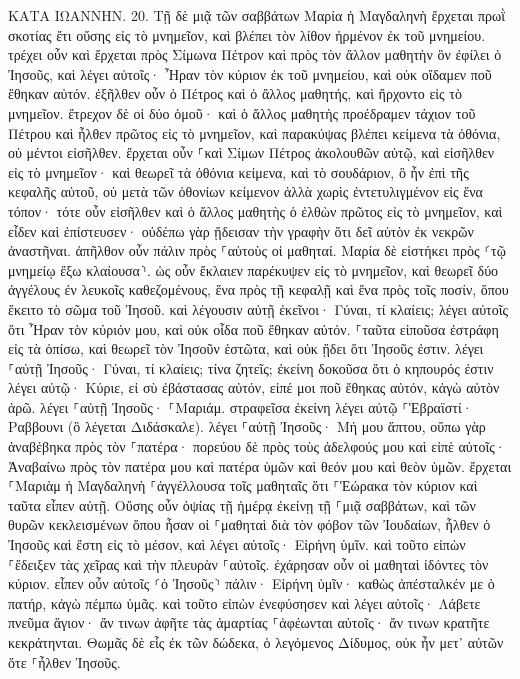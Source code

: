 \documentclass[twoside, 9pt]{extreport}
\begin{document}
ΚΑΤΑ ΙΩΑΝΝΗΝ.
20.
Τῇ δὲ μιᾷ τῶν σαββάτων Μαρία ἡ Μαγδαληνὴ ἔρχεται πρωῒ σκοτίας ἔτι οὔσης εἰς τὸ μνημεῖον, καὶ βλέπει τὸν λίθον ἠρμένον ἐκ τοῦ μνημείου. 
τρέχει οὖν καὶ ἔρχεται πρὸς Σίμωνα Πέτρον καὶ πρὸς τὸν ἄλλον μαθητὴν ὃν ἐφίλει ὁ Ἰησοῦς, καὶ λέγει αὐτοῖς· Ἦραν τὸν κύριον ἐκ τοῦ μνημείου, καὶ οὐκ οἴδαμεν ποῦ ἔθηκαν αὐτόν. 
ἐξῆλθεν οὖν ὁ Πέτρος καὶ ὁ ἄλλος μαθητής, καὶ ἤρχοντο εἰς τὸ μνημεῖον. 
ἔτρεχον δὲ οἱ δύο ὁμοῦ· καὶ ὁ ἄλλος μαθητὴς προέδραμεν τάχιον τοῦ Πέτρου καὶ ἦλθεν πρῶτος εἰς τὸ μνημεῖον, 
καὶ παρακύψας βλέπει κείμενα τὰ ὀθόνια, οὐ μέντοι εἰσῆλθεν. 
ἔρχεται οὖν ⸀καὶ Σίμων Πέτρος ἀκολουθῶν αὐτῷ, καὶ εἰσῆλθεν εἰς τὸ μνημεῖον· καὶ θεωρεῖ τὰ ὀθόνια κείμενα, 
καὶ τὸ σουδάριον, ὃ ἦν ἐπὶ τῆς κεφαλῆς αὐτοῦ, οὐ μετὰ τῶν ὀθονίων κείμενον ἀλλὰ χωρὶς ἐντετυλιγμένον εἰς ἕνα τόπον· 
τότε οὖν εἰσῆλθεν καὶ ὁ ἄλλος μαθητὴς ὁ ἐλθὼν πρῶτος εἰς τὸ μνημεῖον, καὶ εἶδεν καὶ ἐπίστευσεν· 
οὐδέπω γὰρ ᾔδεισαν τὴν γραφὴν ὅτι δεῖ αὐτὸν ἐκ νεκρῶν ἀναστῆναι. 
ἀπῆλθον οὖν πάλιν πρὸς ⸀αὑτοὺς οἱ μαθηταί. 
Μαρία δὲ εἱστήκει πρὸς ⸂τῷ μνημείῳ ἔξω κλαίουσα⸃. ὡς οὖν ἔκλαιεν παρέκυψεν εἰς τὸ μνημεῖον, 
καὶ θεωρεῖ δύο ἀγγέλους ἐν λευκοῖς καθεζομένους, ἕνα πρὸς τῇ κεφαλῇ καὶ ἕνα πρὸς τοῖς ποσίν, ὅπου ἔκειτο τὸ σῶμα τοῦ Ἰησοῦ. 
καὶ λέγουσιν αὐτῇ ἐκεῖνοι· Γύναι, τί κλαίεις; λέγει αὐτοῖς ὅτι Ἦραν τὸν κύριόν μου, καὶ οὐκ οἶδα ποῦ ἔθηκαν αὐτόν. 
⸀ταῦτα εἰποῦσα ἐστράφη εἰς τὰ ὀπίσω, καὶ θεωρεῖ τὸν Ἰησοῦν ἑστῶτα, καὶ οὐκ ᾔδει ὅτι Ἰησοῦς ἐστιν. 
λέγει ⸀αὐτῇ Ἰησοῦς· Γύναι, τί κλαίεις; τίνα ζητεῖς; ἐκείνη δοκοῦσα ὅτι ὁ κηπουρός ἐστιν λέγει αὐτῷ· Κύριε, εἰ σὺ ἐβάστασας αὐτόν, εἰπέ μοι ποῦ ἔθηκας αὐτόν, κἀγὼ αὐτὸν ἀρῶ. 
λέγει ⸀αὐτῇ Ἰησοῦς· ⸀Μαριάμ. στραφεῖσα ἐκείνη λέγει αὐτῷ ⸀Ἑβραϊστί· Ραββουνι (ὃ λέγεται Διδάσκαλε). 
λέγει ⸀αὐτῇ Ἰησοῦς· Μή μου ἅπτου, οὔπω γὰρ ἀναβέβηκα πρὸς τὸν ⸀πατέρα· πορεύου δὲ πρὸς τοὺς ἀδελφούς μου καὶ εἰπὲ αὐτοῖς· Ἀναβαίνω πρὸς τὸν πατέρα μου καὶ πατέρα ὑμῶν καὶ θεόν μου καὶ θεὸν ὑμῶν. 
ἔρχεται ⸀Μαριὰμ ἡ Μαγδαληνὴ ⸀ἀγγέλλουσα τοῖς μαθηταῖς ὅτι ⸀Ἑώρακα τὸν κύριον καὶ ταῦτα εἶπεν αὐτῇ. 
Οὔσης οὖν ὀψίας τῇ ἡμέρᾳ ἐκείνῃ τῇ ⸀μιᾷ σαββάτων, καὶ τῶν θυρῶν κεκλεισμένων ὅπου ἦσαν οἱ ⸀μαθηταὶ διὰ τὸν φόβον τῶν Ἰουδαίων, ἦλθεν ὁ Ἰησοῦς καὶ ἔστη εἰς τὸ μέσον, καὶ λέγει αὐτοῖς· Εἰρήνη ὑμῖν. 
καὶ τοῦτο εἰπὼν ⸀ἔδειξεν τὰς χεῖρας καὶ τὴν πλευρὰν ⸀αὐτοῖς. ἐχάρησαν οὖν οἱ μαθηταὶ ἰδόντες τὸν κύριον. 
εἶπεν οὖν αὐτοῖς ⸂ὁ Ἰησοῦς⸃ πάλιν· Εἰρήνη ὑμῖν· καθὼς ἀπέσταλκέν με ὁ πατήρ, κἀγὼ πέμπω ὑμᾶς. 
καὶ τοῦτο εἰπὼν ἐνεφύσησεν καὶ λέγει αὐτοῖς· Λάβετε πνεῦμα ἅγιον· 
ἄν τινων ἀφῆτε τὰς ἁμαρτίας ⸀ἀφέωνται αὐτοῖς· ἄν τινων κρατῆτε κεκράτηνται. 
Θωμᾶς δὲ εἷς ἐκ τῶν δώδεκα, ὁ λεγόμενος Δίδυμος, οὐκ ἦν μετ᾽ αὐτῶν ὅτε ⸀ἦλθεν Ἰησοῦς. 
\end{document}
